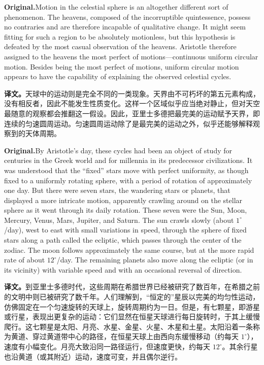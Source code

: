 \documentclass[UTF8]{ctexart}
\newcommand{\orig}{\par\noindent\textbf{Original.}\quad}
\newcommand{\zh}{\par\noindent\textbf{译文。}\quad}
\begin{document}
\orig Motion in the celestial sphere is an altogether different sort of phenomenon. The heavens, composed of the incorruptible quintessence, possess no contraries and are therefore incapable of qualitative change. It might seem fitting for such a region to be absolutely motionless, but this hypothesis is defeated by the most casual observation of the heavens. Aristotle therefore assigned to the heavens the most perfect of motions---continuous uniform circular motion. Besides being the most perfect of motions, uniform circular motion appears to have the capability of explaining the observed celestial cycles.

\zh 天球中的运动则是完全不同的一类现象。天界由不可朽坏的第五元素构成，没有相反者，因此不能发生性质变化。这样一个区域似乎应当绝对静止，但对天空最随意的观察都会推翻这一假设。因此，亚里士多德把最完美的运动赋予天界，即连续的匀速圆周运动。匀速圆周运动除了是最完美的运动之外，似乎还能够解释观察到的天体周期。

\orig By Aristotle's day, these cycles had been an object of study for centuries in the Greek world and for millennia in its predecessor civilizations. It was understood that the ``fixed'' stars move with perfect uniformity, as though fixed to a uniformly rotating sphere, with a period of rotation of approximately one day. But there were seven stars, the wandering stars or planets, that displayed a more intricate motion, apparently crawling around on the stellar sphere as it went through its daily rotation. These seven were the Sun, Moon, Mercury, Venus, Mars, Jupiter, and Saturn. The sun crawls slowly (about $1^\circ$/day), west to east with small variations in speed, through the sphere of fixed stars along a path called the ecliptic, which passes through the center of the zodiac. The moon follows approximately the same course, but at the more rapid rate of about $12^\circ$/day. The remaining planets also move along the ecliptic (or in its vicinity) with variable speed and with an occasional reversal of direction.

\zh 到亚里士多德时代，这些周期在希腊世界已经被研究了数百年，在希腊之前的文明中则已被研究了数千年。人们理解到，“恒定的”星辰以完美的均匀性运动，仿佛固定在一个匀速旋转的天球上，旋转周期约为一日。但是，有七颗星，即游星或行星，表现出更复杂的运动：它们显然在恒星天球进行每日旋转时，于其上缓慢爬行。这七颗星是太阳、月亮、水星、金星、火星、木星和土星。太阳沿着一条称为黄道、穿过黄道带中心的路径，在恒星天球上由西向东缓慢移动（约每天 $1^\circ$），速度有小幅变化。月亮大致沿同一路径运行，但速度更快，约每天 $12^\circ$。其余行星也沿黄道（或其附近）运动，速度可变，并且偶尔逆行。
\end{document}
